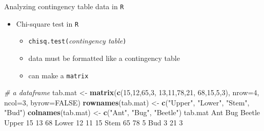 \documentclass[
  ignorenonframetext,
  t]{beamer}
\newenvironment{Shaded}{\begin{snugshade}}{\end{snugshade}}
\newcommand{\CommentTok}[1]{\textcolor[rgb]{0.56,0.35,0.01}{\textit{#1}}}
\newcommand{\DataTypeTok}[1]{\textcolor[rgb]{0.13,0.29,0.53}{#1}}
\newcommand{\DecValTok}[1]{\textcolor[rgb]{0.00,0.00,0.81}{#1}}
\newcommand{\KeywordTok}[1]{\textcolor[rgb]{0.13,0.29,0.53}{\textbf{#1}}}
\newcommand{\NormalTok}[1]{#1}
\newcommand{\OtherTok}[1]{\textcolor[rgb]{0.56,0.35,0.01}{#1}}
\newcommand{\StringTok}[1]{\textcolor[rgb]{0.31,0.60,0.02}{#1}}
\providecommand{\tightlist}{%
  \setlength{\itemsep}{0pt}\setlength{\parskip}{0pt}}
\begin{document}
\begin{frame}[fragile]{Analyzing contingency table data in \texttt{R}}
\protect\hypertarget{analyzing-contingency-table-data-in-4}{}

\begin{itemize}
\tightlist
\item
  Chi-square test in \texttt{R}

  \begin{itemize}
  \tightlist
  \item
    \texttt{chisq.test(}\emph{contingency table}\texttt{)}
  \item
    data must be formatted like a contingency table
  \item
    can make a \texttt{matrix}
  \end{itemize}
\end{itemize}

\scriptsize

\begin{Shaded}
\begin{Highlighting}[]
\CommentTok{# a dataframe}
\NormalTok{tab.mat <-}\StringTok{ }\KeywordTok{matrix}\NormalTok{(}\KeywordTok{c}\NormalTok{(}\DecValTok{15}\NormalTok{,}\DecValTok{12}\NormalTok{,}\DecValTok{65}\NormalTok{,}\DecValTok{3}\NormalTok{,}
                    \DecValTok{13}\NormalTok{,}\DecValTok{11}\NormalTok{,}\DecValTok{78}\NormalTok{,}\DecValTok{21}\NormalTok{,}
                    \DecValTok{68}\NormalTok{,}\DecValTok{15}\NormalTok{,}\DecValTok{5}\NormalTok{,}\DecValTok{3}\NormalTok{), }\DataTypeTok{nrow=}\DecValTok{4}\NormalTok{, }\DataTypeTok{ncol=}\DecValTok{3}\NormalTok{, }\DataTypeTok{byrow=}\OtherTok{FALSE}\NormalTok{)}
\KeywordTok{rownames}\NormalTok{(tab.mat) <-}\StringTok{ }\KeywordTok{c}\NormalTok{(}\StringTok{"Upper"}\NormalTok{, }\StringTok{"Lower"}\NormalTok{, }\StringTok{"Stem"}\NormalTok{, }\StringTok{"Bud"}\NormalTok{)}
\KeywordTok{colnames}\NormalTok{(tab.mat) <-}\StringTok{ }\KeywordTok{c}\NormalTok{(}\StringTok{"Ant"}\NormalTok{, }\StringTok{"Bug"}\NormalTok{, }\StringTok{"Beetle"}\NormalTok{)}
\NormalTok{tab.mat}
\NormalTok{      Ant Bug Beetle}
\NormalTok{Upper  }\DecValTok{15}  \DecValTok{13}     \DecValTok{68}
\NormalTok{Lower  }\DecValTok{12}  \DecValTok{11}     \DecValTok{15}
\NormalTok{Stem   }\DecValTok{65}  \DecValTok{78}      \DecValTok{5}
\NormalTok{Bud     }\DecValTok{3}  \DecValTok{21}      \DecValTok{3}
\end{Highlighting}
\end{Shaded}

\end{frame}
\end{document}
